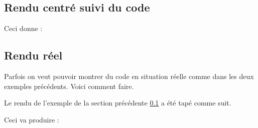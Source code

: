 \begin{docshowcase}
\end{docshowcase}




\subsection{Rendu centré suivi du code}\label{output-centered}

\begin{doclatex-alone}
\end{doclatex-alone}

Ceci donne :

\begin{docshowcase}
\end{docshowcase}




\subsection{Rendu réel}

Parfois on veut pouvoir montrer du code en situation réelle comme dans les deux exemples précédents. Voici comment faire.



Le rendu de l'exemple de la section précédente \ref{output-centered} a été tapé comme suit.

\begin{doclatex-alone}
\begin{docshowcase}
\end{docshowcase}
\end{doclatex-alone}





\begin{doclatex-alone}
\end{doclatex-alone}

Ceci va produire :

\begin{showcase}
\end{showcase}

